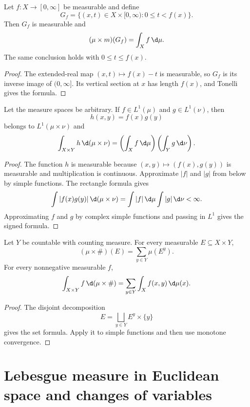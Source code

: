 \begin{prop}[Subgraphs]
Let $f:X\to[0,\infty]$ be measurable and define
\[
G_f=\{(x,t)\in X\times[0,\infty):0\leq t<f(x)\}.
\]
Then $G_f$ is measurable and
\[
(\mu\times m)(G_f)=\int_Xf\,\d\mu.
\]
The same conclusion holds with $0\leq t\leq f(x)$.
\end{prop}

\begin{proof}
The extended-real map $(x,t)\mapsto f(x)-t$ is measurable, so $G_f$ is its inverse image of $(0,\infty]$. Its vertical section at $x$ has length $f(x)$, and Tonelli gives the formula.
\end{proof}

\begin{prop}
Let the measure spaces be arbitrary. If $f\in L^1(\mu)$ and $g\in L^1(\nu)$, then
\[
h(x,y)=f(x)g(y)
\]
belongs to $L^1(\mu\times\nu)$ and
\[
\int_{X\times Y}h\,\d(\mu\times\nu)
 =\left(\int_Xf\,\d\mu\right)
  \left(\int_Yg\,\d\nu\right).
\]
\end{prop}

\begin{proof}
The function $h$ is measurable because $(x,y)\mapsto(f(x),g(y))$ is measurable and multiplication is continuous. Approximate $|f|$ and $|g|$ from below by simple functions. The rectangle formula gives
\[
\int |f(x)g(y)|\,\d(\mu\times\nu)
 =\int|f|\,\d\mu\int|g|\,\d\nu<\infty.
\]
Approximating $f$ and $g$ by complex simple functions and passing in $L^1$ gives the signed formula.
\end{proof}

\begin{prop}
Let $Y$ be countable with counting measure. For every measurable $E\subseteq X\times Y$,
\[
(\mu\times\#)(E)=\sum_{y\in Y}\mu(E^y).
\]
For every nonnegative measurable $f$,
\[
\int_{X\times Y}f\,\d(\mu\times\#)
 =\sum_{y\in Y}\int_Xf(x,y)\,\d\mu(x).
\]
\end{prop}

\begin{proof}
The disjoint decomposition
\[
E=\bigsqcup_{y\in Y}E^y\times\{y\}
\]
gives the set formula. Apply it to simple functions and then use monotone convergence.
\end{proof}

\section{Lebesgue measure in Euclidean space and changes of variables}

